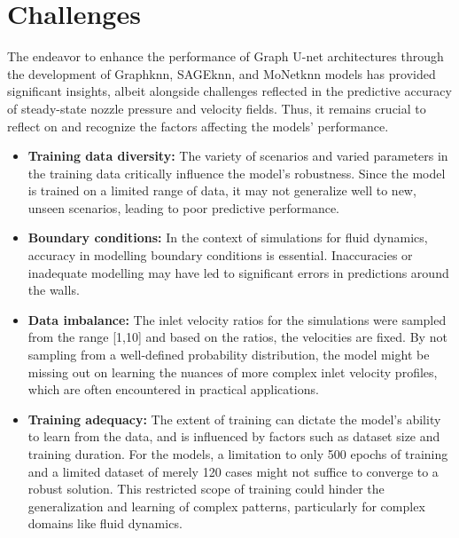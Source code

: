\section{Challenges}
The endeavor to enhance the performance of Graph U-net architectures through the development of Graphknn, SAGEknn, and MoNetknn models has provided significant insights, albeit alongside challenges reflected in the predictive accuracy of steady-state nozzle pressure and velocity fields. Thus, it remains crucial to reflect on and recognize the factors affecting the models' performance. 
\begin{itemize}
\item \textbf{Training data diversity:} The variety of scenarios and varied parameters in the training data critically influence the model's robustness. Since the model is trained on a limited range of data, it may not generalize well to new, unseen scenarios, leading to poor predictive performance.
\item \textbf{Boundary conditions:} In the context of simulations for fluid dynamics, accuracy in modelling boundary conditions is essential. Inaccuracies or inadequate modelling may have led to significant errors in predictions around the walls.
\item \textbf{Data imbalance:} The inlet velocity ratios for the simulations were sampled from the range [1,10] and based on the ratios, the velocities are fixed. By not sampling from a well-defined probability distribution, the model might be missing out on learning the nuances of more complex inlet velocity profiles, which are often encountered in practical applications.
\item \textbf{Training adequacy:} The extent of training can dictate the model's ability to learn from the data, and is influenced by factors such as dataset size and training duration. For the models, a limitation to only 500 epochs of training and a limited dataset of merely 120 cases might not suffice to converge to a robust solution. This restricted scope of training could hinder the generalization and learning of complex patterns, particularly for complex domains like fluid dynamics.
\end{itemize}
